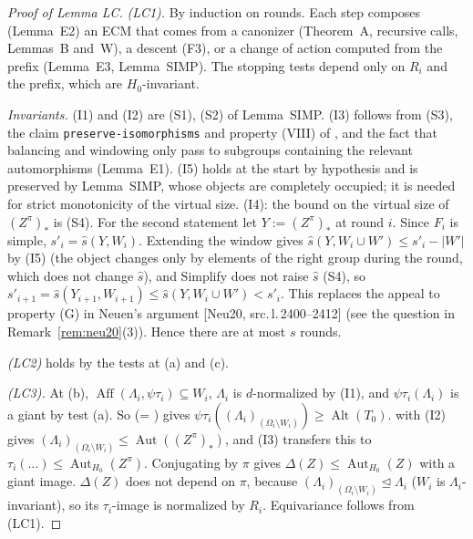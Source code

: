 \documentclass[11pt]{article}
\theoremstyle{plain}
\theoremstyle{definition}
\theoremstyle{remark}
\theoremstyle{named}
\theoremstyle{namedrm}
\newcommand{\Alt}{\operatorname{Alt}}
\newcommand{\Aut}{\operatorname{Aut}}
\newcommand{\Aff}{\operatorname{Aff}}
\newcommand{\src}[2]{[#1, src.\,l.\,#2]}
\begin{document}
\begin{proof}[Proof of Lemma LC]
\emph{(LC1).} By induction on rounds. Each step composes (Lemma~E2) an ECM that comes from a canonizer
(Theorem~A, recursive calls, Lemmas~B and~W), a descent (F3), or a change of action computed from the prefix
(Lemma~E3, Lemma~SIMP). The stopping tests depend only on $R_i$ and the prefix, which are
$H_0$-invariant.

\emph{Invariants.} (I1) and (I2) are (S1), (S2) of Lemma~SIMP. (I3) follows from (S3), the claim
\texttt{preserve-isomorphisms} and property (VIII) of \cite[Thm.~4.9]{Neu20}, and the fact that balancing
and windowing only pass to subgroups containing the relevant automorphisms (Lemma~E1). (I5) holds at the start by
hypothesis and is preserved by Lemma~SIMP, whose objects are completely occupied; it is needed for strict monotonicity of the virtual size.
(I4): the bound on the virtual size of $(Z^\pi)_*$ is (S4). For the second statement let $Y:=(Z^\pi)_*$ at round $i$. Since $F_i$ is simple,
$s'_i=\widehat s(Y,W_i)$. Extending the window gives $\widehat s(Y,W_i\cup W')\le s'_i-|W'|$ by (I5) (the object changes only by elements of the right
group during the round, which does not change $\widehat s$), and Simplify does not raise $\widehat s$ (S4), so
$s'_{i+1}=\widehat s(Y_{i+1},W_{i+1})\le\widehat s(Y,W_i\cup W')<s'_i$. This replaces the appeal to property (G) in Neuen's argument \src{Neu20}{2400--2412} (see the question in Remark~\ref{rem:neu20}(3)). Hence there are at most $s$ rounds.

\emph{(LC2)} holds by the tests at (a) and (c).

\emph{(LC3).} At (b), $\Aff(\Lambda_i,\psi\tau_i)\subseteq W_i$, $\Lambda_i$ is $d$-normalized by (I1), and $\psi\tau_i(\Lambda_i)$ is a
giant by test (a). So \cite[Thm.~4.6]{Neu20} (= \cite[Thm.~5.8]{GNS}) gives
$\psi\tau_i((\Lambda_i)_{(\Omega_i\setminus W_i)})\ge\Alt(T_0)$. \cite[Lemma~4.16]{Neu20} with (I2) gives
$(\Lambda_i)_{(\Omega_i\setminus W_i)}\le\Aut((Z^\pi)_*)$, and (I3) transfers this to $\tau_i(\dots)\le\Aut_{H_0}(Z^\pi)$.
Conjugating by $\pi$ gives $\Delta(Z)\le\Aut_{H_0}(Z)$ with a giant image. $\Delta(Z)$ does not depend on $\pi$, because
$(\Lambda_i)_{(\Omega_i\setminus W_i)}\trianglelefteq\Lambda_i$ ($W_i$ is $\Lambda_i$-invariant), so its $\tau_i$-image is normalized by
$R_i$. Equivariance follows from (LC1).


\end{proof}
\end{document}

